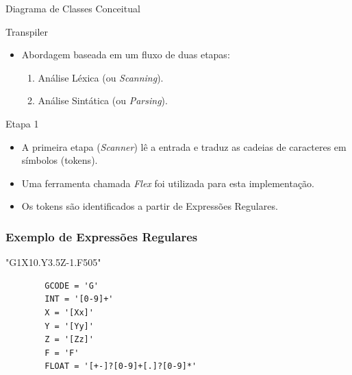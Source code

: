 \documentclass[aspectratio=169]{beamer}
\begin{document}
{\begin{frame}{Diagrama de Classes Conceitual}
\end{frame}




\begin{frame}{Transpiler}
  \begin{itemize}
    \item Abordagem baseada em um fluxo de duas etapas:
    \begin{enumerate}
      \item Análise Léxica (ou \emph{Scanning}).
      \item Análise Sintática (ou \emph{Parsing}).
    \end{enumerate}
  \end{itemize}
\end{frame}


\begin{frame}{Etapa 1}
  \begin{itemize}
    \item A primeira etapa (\emph{Scanner}) l\^e a entrada e traduz as 
          cadeias de caracteres em símbolos (tokens). 
    \item Uma ferramenta chamada \emph{Flex} foi utilizada para esta 
          implementa\c c\~ao.
    \item Os tokens são identificados a partir de Expressões Regulares.
  \end{itemize}
\end{frame}


\begin{frame}[fragile]
  \frametitle{Exemplo de Expressões Regulares}
  \begin{example}
      "G1X10.Y3.5Z-1.F505"
      \begin{lstlisting}
        GCODE = 'G'        
        INT = '[0-9]+'
        X = '[Xx]'
        Y = '[Yy]'
        Z = '[Zz]'
        F = 'F'
        FLOAT = '[+-]?[0-9]+[.]?[0-9]*'
      \end{lstlisting}
    \end{example}
  \end{frame}


}
\end{document}
